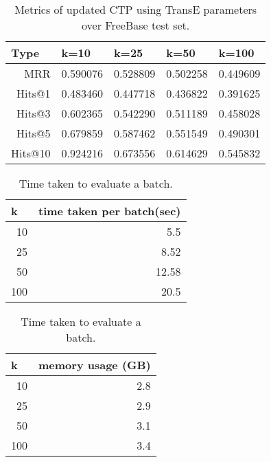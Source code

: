 \documentclass[Other]{iitddiss}
\begin{document}
\begin{table}[H]
	\centering
	\begin{tabular}{|r|r|r|r|r|}
		\hline
		\multicolumn{1}{|l|}{\textbf{Type}} & \multicolumn{1}{l|}{\textbf{k=10}} & \multicolumn{1}{l|}{\textbf{k=25}} & \multicolumn{1}{l|}{\textbf{k=50}} & \multicolumn{1}{l|}{\textbf{k=100}} \\ \hline
		MRR                                    & 0.590076	& 0.528809      	&0.502258  & 0.449609                              \\ \hline
		Hits@1                                    & 0.483460	& 0.447718		&0.436822  & 0.391625                                   \\ \hline
		Hits@3                                    & 0.602365	& 0.542290		&0.511189  & 0.458028                                   \\ \hline
		Hits@5                                    & 0.679859	& 0.587462		&0.551549  & 0.490301                                    \\ \hline
		Hits@10                                    & 0.924216	& 0.673556	&0.614629  & 0.545832                                  \\ \hline
	\end{tabular}
	\caption{Metrics of updated CTP using TransE parameters over FreeBase test set. }
	\label{tab:transE_MRR}
\end{table}


\begin{table}[H]
	\centering
	\begin{tabular}{|r|r|}
		\hline
		\multicolumn{1}{|l|}{\textbf{k}} & \multicolumn{1}{l|}{\textbf{time taken per batch(sec)}}  \\ \hline
		10	&	5.5                              \\ \hline
		25	&	8.52                              \\ \hline
		50	&	12.58                              \\ \hline
		100	&	20.5                              \\ \hline
	\end{tabular}
	\caption{Time taken to evaluate a batch. }
	\label{tab:transE_MRR}
\end{table}


\begin{table}[H]
	\centering
	\begin{tabular}{|r|r|}
		\hline
		\multicolumn{1}{|l|}{\textbf{k}} & \multicolumn{1}{l|}{\textbf{memory usage (GB)}}  \\ \hline
		10	&	2.8                              \\ \hline
		25	&	2.9                              \\ \hline
		50	&	3.1                              \\ \hline
		100	&	3.4                              \\ \hline
	\end{tabular}
	\caption{Time taken to evaluate a batch. }
	\label{tab:transE_MRR}
\end{table}
\end{document}
